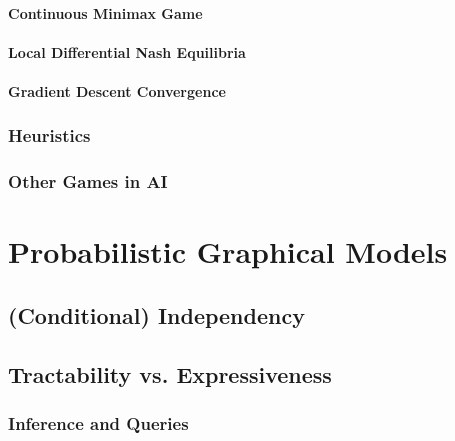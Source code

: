 			\subsubsection{Continuous Minimax Game} %

			\subsubsection{Local Differential Nash Equilibria} %

			\subsubsection{Gradient Descent Convergence} %

		\subsection{Heuristics} %

		\subsection{Other Games in AI} %

\chapter{Probabilistic Graphical Models} %

	\section{(Conditional) Independency} %

	\section{Tractability vs. Expressiveness} %

		\subsection{Inference and Queries} %

